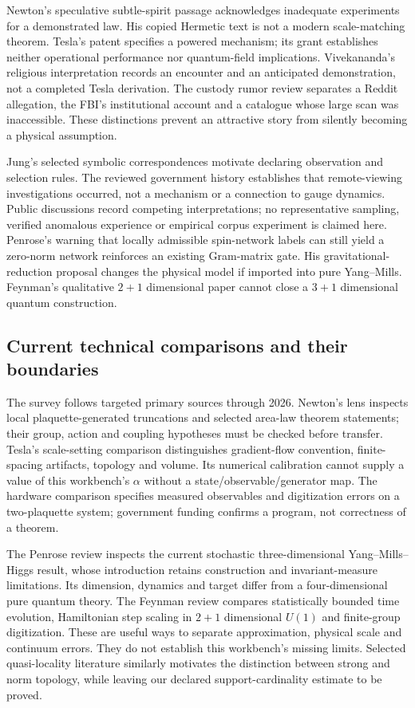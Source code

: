 Newton's speculative subtle-spirit passage acknowledges inadequate experiments for a demonstrated law. His copied Hermetic text is not a modern scale-matching theorem. Tesla's patent specifies a powered mechanism; its grant establishes neither operational performance nor quantum-field implications. Vivekananda's religious interpretation records an encounter and an anticipated demonstration, not a completed Tesla derivation. The custody rumor review separates a Reddit allegation, the FBI's institutional account and a catalogue whose large scan was inaccessible. These distinctions prevent an attractive story from silently becoming a physical assumption.

Jung's selected symbolic correspondences motivate declaring observation and selection rules. The reviewed government history establishes that remote-viewing investigations occurred, not a mechanism or a connection to gauge dynamics. Public discussions record competing interpretations; no representative sampling, verified anomalous experience or empirical corpus experiment is claimed here. Penrose's warning that locally admissible spin-network labels can still yield a zero-norm network reinforces an existing Gram-matrix gate. His gravitational-reduction proposal changes the physical model if imported into pure Yang--Mills. Feynman's qualitative $2+1$ dimensional paper cannot close a $3+1$ dimensional quantum construction.

\subsection{Current technical comparisons and their boundaries}
The survey follows targeted primary sources through 2026. Newton's lens inspects local plaquette-generated truncations and selected area-law theorem statements; their group, action and coupling hypotheses must be checked before transfer. Tesla's scale-setting comparison distinguishes gradient-flow convention, finite-spacing artifacts, topology and volume. Its numerical calibration cannot supply a value of this workbench's $\alpha$ without a state/observable/generator map. The hardware comparison specifies measured observables and digitization errors on a two-plaquette system; government funding confirms a program, not correctness of a theorem.

The Penrose review inspects the current stochastic three-dimensional Yang--Mills--Higgs result, whose introduction retains construction and invariant-measure limitations. Its dimension, dynamics and target differ from a four-dimensional pure quantum theory. The Feynman review compares statistically bounded time evolution, Hamiltonian step scaling in $2+1$ dimensional $U(1)$ and finite-group digitization. These are useful ways to separate approximation, physical scale and continuum errors. They do not establish this workbench's missing limits. Selected quasi-locality literature similarly motivates the distinction between strong and norm topology, while leaving our declared support-cardinality estimate to be proved.

